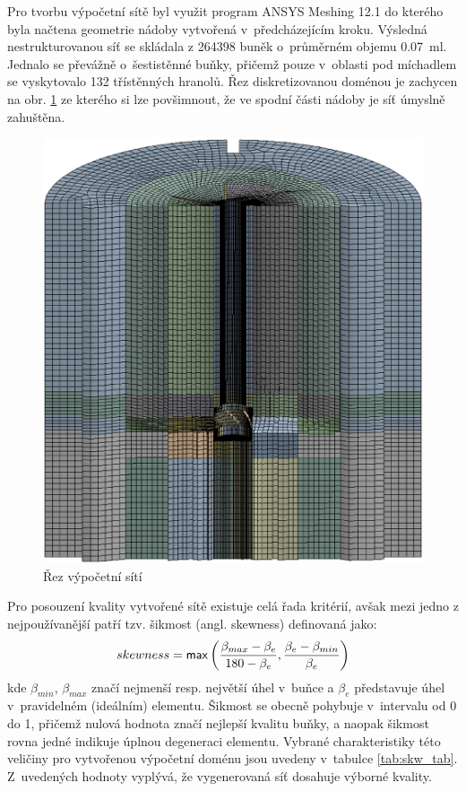 Pro tvorbu výpočetní sítě byl využit program ANSYS Meshing 12.1 do kterého byla načtena geometrie nádoby vytvořená v~předcházejícím kroku. Výsledná nestrukturovanou síť se skládala z \num{264398} buněk o~průměrném objemu \SI{0.07}{\milli\litre}. Jednalo se převážně o~šestistěnné buňky, přičemž pouze v~oblasti pod míchadlem se vyskytovalo \num{132} třístěnných hranolů. Řez diskretizovanou doménou je zachycen na obr. \ref{fig:mesh} ze kterého si lze povšimnout, že ve spodní části nádoby je síť úmyslně zahuštěna. 
\begin{figure}[t]
\centering
\includegraphics[scale=0.28]{images/mesh.eps}
\caption{Řez výpočetní sítí}
\label{fig:mesh}
\end{figure} 
Pro posouzení kvality vytvořené sítě existuje celá řada kritérií, avšak mezi jedno z nejpoužívanější patří tzv. šikmost (angl. skewness) definovaná jako:
\begin{equation}
      skewness = \mathsf{max}\left( \frac{\beta_{max} - \beta_{e}}{180 - \beta_{e}}, \frac{\beta_{e} - \beta_{min}}{\beta_{e}} \right)
  	\label{eq:skw}
\end{equation} 
kde $\beta_{min}$, $\beta_{max}$ značí nejmenší resp. největší úhel v~buňce a $\beta_{e}$ představuje úhel v~pravidelném (ideálním) elementu. Šikmost se obecně pohybuje v~intervalu od \num{0} do \num{1}, přičemž nulová hodnota značí nejlepší kvalitu buňky, a naopak šikmost rovna jedné indikuje úplnou degeneraci elementu. Vybrané charakteristiky této veličiny pro vytvořenou výpočetní doménu jsou uvedeny v~tabulce \ref{tab:skw_tab}. Z~uvedených hodnoty vyplývá, že vygenerovaná síť dosahuje výborné kvality.
